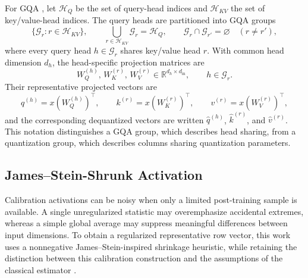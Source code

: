 For GQA \cite{ainslie2023gqa}, let $\mathcal{H}_Q$ be the set of query-head indices and $\mathcal{H}_{KV}$ the set of key/value-head indices. The query heads are partitioned into GQA groups
\begin{equation}
\{\mathcal{G}_r:r\in\mathcal{H}_{KV}\},
\qquad
\bigcup_{r\in\mathcal{H}_{KV}}\mathcal{G}_r=\mathcal{H}_Q,
\qquad
\mathcal{G}_r\cap\mathcal{G}_{r'}=\varnothing\quad(r\neq r'),
\end{equation}
where every query head $h\in\mathcal{G}_r$ shares key/value head $r$. With common head dimension $d_h$, the head-specific projection matrices are
\begin{equation}
W_Q^{(h)},\,W_K^{(r)},\,W_V^{(r)}
\in\mathbb{R}^{d_h\times d_{\mathrm{in}}},
\qquad h\in\mathcal{G}_r.
\end{equation}
Their representative projected vectors are
\begin{equation}
q^{(h)}=x(W_Q^{(h)})^\top,\qquad
k^{(r)}=x(W_K^{(r)})^\top,\qquad
v^{(r)}=x(W_V^{(r)})^\top,
\end{equation}
and the corresponding dequantized vectors are written $\hat q^{(h)}$, $\hat k^{(r)}$, and $\hat v^{(r)}$. This notation distinguishes a GQA group, which describes head sharing, from a quantization group, which describes columns sharing quantization parameters.

\subsection{James--Stein-Shrunk Activation}

Calibration activations can be noisy when only a limited post-training sample is available. A single unregularized statistic may overemphasize accidental extremes, whereas a simple global average may suppress meaningful differences between input dimensions. To obtain a regularized representative row vector, this work uses a nonnegative James--Stein-inspired shrinkage heuristic, while retaining the distinction between this calibration construction and the assumptions of the classical estimator \cite{james1961estimation}.

